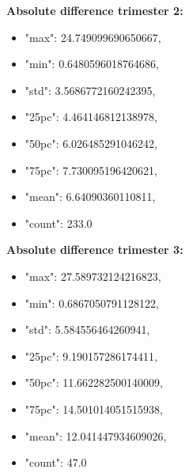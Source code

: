 	\textbf{Absolute difference trimester 2:}
	\begin{itemize}
		\item "max": 24.749099690650667,
		\item "min": 0.6480596018764686,
		\item "std": 3.5686772160242395,
		\item "25pc": 4.464146812138978,
		\item "50pc": 6.026485291046242,
		\item "75pc": 7.730095196420621,
		\item "mean": 6.64090360110811,
		\item "count": 233.0
	\end{itemize}

	\textbf{Absolute difference trimester 3:}
	\begin{itemize}
		\item "max": 27.589732124216823,
		\item "min": 0.6867050791128122,
		\item "std": 5.584556464260941,
		\item "25pc": 9.190157286174411,
		\item "50pc": 11.662282500140009,
		\item "75pc": 14.501014051515938,
		\item "mean": 12.041447934609026,
		\item "count": 47.0
	\end{itemize}
	
	
	
	